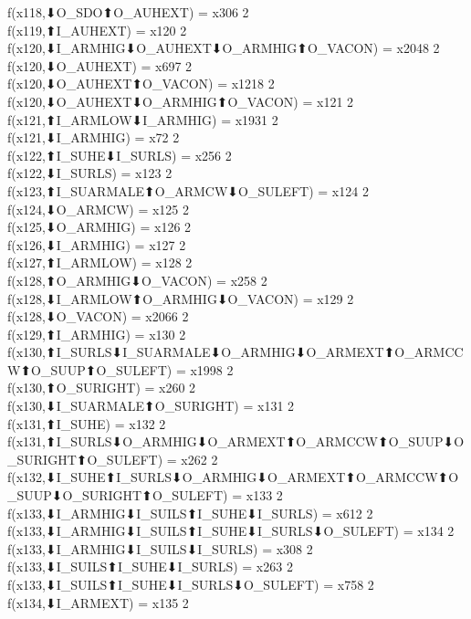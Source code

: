 f(x118,⬇O_SDO⬆O_AUHEXT) = x306 {2} \\
f(x119,⬆I_AUHEXT) = x120 {2} \\
f(x120,⬇I_ARMHIG⬇O_AUHEXT⬇O_ARMHIG⬆O_VACON) = x2048 {2} \\
f(x120,⬇O_AUHEXT) = x697 {2} \\
f(x120,⬇O_AUHEXT⬆O_VACON) = x1218 {2} \\
f(x120,⬇O_AUHEXT⬇O_ARMHIG⬆O_VACON) = x121 {2} \\
f(x121,⬆I_ARMLOW⬇I_ARMHIG) = x1931 {2} \\
f(x121,⬇I_ARMHIG) = x72 {2} \\
f(x122,⬆I_SUHE⬇I_SURLS) = x256 {2} \\
f(x122,⬇I_SURLS) = x123 {2} \\
f(x123,⬆I_SUARMALE⬆O_ARMCW⬇O_SULEFT) = x124 {2} \\
f(x124,⬇O_ARMCW) = x125 {2} \\
f(x125,⬇O_ARMHIG) = x126 {2} \\
f(x126,⬇I_ARMHIG) = x127 {2} \\
f(x127,⬆I_ARMLOW) = x128 {2} \\
f(x128,⬆O_ARMHIG⬇O_VACON) = x258 {2} \\
f(x128,⬇I_ARMLOW⬆O_ARMHIG⬇O_VACON) = x129 {2} \\
f(x128,⬇O_VACON) = x2066 {2} \\
f(x129,⬆I_ARMHIG) = x130 {2} \\
f(x130,⬆I_SURLS⬇I_SUARMALE⬇O_ARMHIG⬇O_ARMEXT⬆O_ARMCCW⬆O_SUUP⬆O_SULEFT) = x1998 {2} \\
f(x130,⬆O_SURIGHT) = x260 {2} \\
f(x130,⬇I_SUARMALE⬆O_SURIGHT) = x131 {2} \\
f(x131,⬆I_SUHE) = x132 {2} \\
f(x131,⬆I_SURLS⬇O_ARMHIG⬇O_ARMEXT⬆O_ARMCCW⬆O_SUUP⬇O_SURIGHT⬆O_SULEFT) = x262 {2} \\
f(x132,⬇I_SUHE⬆I_SURLS⬇O_ARMHIG⬇O_ARMEXT⬆O_ARMCCW⬆O_SUUP⬇O_SURIGHT⬆O_SULEFT) = x133 {2} \\
f(x133,⬇I_ARMHIG⬇I_SUILS⬆I_SUHE⬇I_SURLS) = x612 {2} \\
f(x133,⬇I_ARMHIG⬇I_SUILS⬆I_SUHE⬇I_SURLS⬇O_SULEFT) = x134 {2} \\
f(x133,⬇I_ARMHIG⬇I_SUILS⬇I_SURLS) = x308 {2} \\
f(x133,⬇I_SUILS⬆I_SUHE⬇I_SURLS) = x263 {2} \\
f(x133,⬇I_SUILS⬆I_SUHE⬇I_SURLS⬇O_SULEFT) = x758 {2} \\
f(x134,⬇I_ARMEXT) = x135 {2} \\
